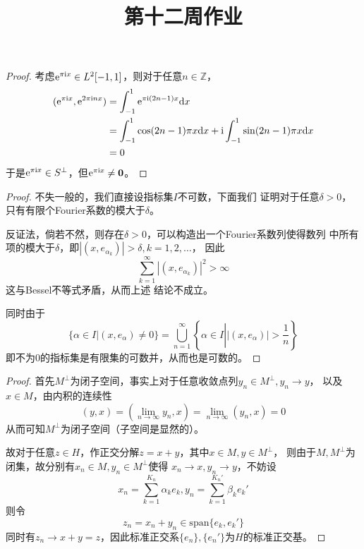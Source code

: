 \documentclass[cn]{homework}
\title{第十二周作业}
\newcommand{\img}{\mathrm i}
\begin{document}
    \maketitle

    \problem
    \begin{subproblem}[(\arabic*)]
        \item

        \item
        \begin{proof}
            考虑$\e^{\pi\img x}\in L^2[-1,1]$，则对于任意$n\in\mathbb Z$，
            \[\begin{aligned}
                (\e^{\pi\img x},\e^{2\pi\img nx})
                &=\int_{-1}^1\e^{\pi\img(2n-1)x}\diff x\\
                &=\int_{-1}^1\cos(2n-1)\pi x\diff x+\img\int_{-1}^1\sin(2n-1)\pi x\diff x\\
                &=0
            \end{aligned}\]
            于是$\e^{\pi\img x}\in S^\perp$，但$\e^{\pi\img x}\neq\boldsymbol 0$。
        \end{proof}
    \end{subproblem}

    \problem

    \problem
    \begin{proof}
        不失一般的，我们直接设指标集$I$不可数，下面我们
        证明对于任意$\delta>0$，只有有限个Fourier系数的模大于$\delta$。

        反证法，倘若不然，则存在$\delta>0$，可以构造出一个Fourier系数列使得数列
        中所有项的模大于$\delta$，即$|(x,e_{\alpha_k})|>\delta,k=1,2,\ldots$，
        因此
        \[\sum_{k=1}^\infty|(x,e_{\alpha_k})|^2>\infty\]
        这与Bessel不等式矛盾，从而上述
        结论不成立。

        同时由于
        \[\{\alpha\in I|(x,e_\alpha)\neq 0\}
        =\bigcup_{n=1}^\infty\left\{\alpha\in I\left||(x,e_\alpha)|>\frac{1}{n}\right.\right\}\]
        即不为0的指标集是有限集的可数并，从而也是可数的。
    \end{proof}

    \problem
    \begin{proof}
        首先$M^\perp$为闭子空间，事实上对于任意收敛点列$y_n\in M^\perp,y_n\to y$，
        以及$x\in M$，由内积的连续性
        \[(y,x)=\left(\lim_{n\to\infty}y_n,x\right)
        =\lim_{n\to\infty}(y_n,x)=0\]
        从而可知$M^\perp$为闭子空间（子空间是显然的）。

        故对于任意$z\in H$，作正交分解$z=x+y$，其中$x\in M,y\in M^\perp$，
        则由于$M,M^\perp$为闭集，故分别有$x_n\in M,y_n\in M^\perp$使得
        $x_n\to x,y_n\to y$，不妨设
        \[x_n=\sum_{k=1}^{K_n}\alpha_ke_k,
        y_n=\sum_{k=1}^{K_n'}\beta_ke_k'\]
        则令
        \[z_n=x_n+y_n\in\mathrm{span}\{e_k,e_k'\}\]
        同时有$z_n\to x+y=z$，因此标准正交系$\{e_n\},\{e_n'\}$为$H$的标准正交基。
    \end{proof}
\end{document}
